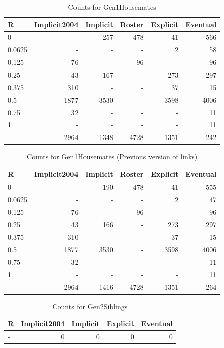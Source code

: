 \documentclass[a4paper]{article}\usepackage[]{graphicx}\usepackage[]{color}
\begin{document}
\begin{table}[ht]
\centering
{\large
\begin{tabular}{lrrrrr}
  \hline
R & Implicit2004 & Implicit & Roster & Explicit & Eventual \\ 
  \hline
0 & - & 257 & 478 &  41 & 566 \\ 
  0.0625 & - & - & - &   2 &  58 \\ 
  0.125 &  76 & - &  96 & - &  96 \\ 
  0.25 &  43 & 167 & - & 273 & 297 \\ 
  0.375 & 310 & - & - &  37 &  15 \\ 
  0.5 & 1877 & 3530 & - & 3598 & 4006 \\ 
  0.75 &  32 & - & - & - &  11 \\ 
  1 & - & - & - & - &  11 \\ 
  - & 2964 & 1348 & 4728 & 1351 & 242 \\ 
   \hline
\end{tabular}
}
\caption{Counts for Gen1Housemates} 
\end{table}
\begin{table}[ht]
\centering
{\large
\begin{tabular}{lrrrrr}
  \hline
R & Implicit2004 & Implicit & Roster & Explicit & Eventual \\ 
  \hline
0 & - & 190 & 478 &  41 & 555 \\ 
  0.0625 & - & - & - &   2 &  47 \\ 
  0.125 &  76 & - &  96 & - &  96 \\ 
  0.25 &  43 & 166 & - & 273 & 297 \\ 
  0.375 & 310 & - & - &  37 &  15 \\ 
  0.5 & 1877 & 3530 & - & 3598 & 4006 \\ 
  0.75 &  32 & - & - & - &  11 \\ 
  1 & - & - & - & - &  11 \\ 
  - & 2964 & 1416 & 4728 & 1351 & 264 \\ 
   \hline
\end{tabular}
}
\caption{Counts for Gen1Housemates (Previous version of links)} 
\end{table}
\begin{table}[ht]
\centering
{\large
\begin{tabular}{lrrrr}
  \hline
R & Implicit2004 & Implicit & Explicit & Eventual \\ 
  \hline
- &   0 &   0 &   0 &   0 \\ 
   \hline
\end{tabular}
}
\caption{Counts for Gen2Siblings} 
\end{table}
\end{document}
